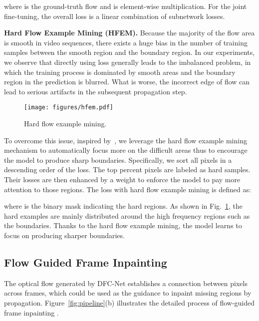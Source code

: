 \documentclass[10pt,twocolumn,letterpaper]{article}
\begin{document}
where  is the ground-truth flow and  is element-wise multiplication. For the joint fine-tuning, the overall loss is a linear combination of subnetwork losses.


\noindent\textbf{Hard Flow Example Mining (HFEM).}
Because the majority of the flow area is smooth in video sequences, there exists a huge bias in the number of training samples between the smooth region and the boundary region. In our experiments, we observe that directly using  loss generally leads to the imbalanced problem, in which the training process is dominated by smooth areas and the boundary region in the prediction is blurred.
What is worse, the incorrect edge of flow can lead to serious artifacts in the subsequent propagation step.
\begin{figure}
	\centering
	\texttt{[image: figures/hfem.pdf]}
	\vspace{-20pt}
	\caption{\small{Hard flow example mining.}}
	\label{fig:hfem}
	\vspace{-15pt}
\end{figure}

To overcome this issue, inspired by~\cite{shrivastava2016training},  we leverage the hard flow example mining mechanism to automatically focus more on the difficult areas thus to encourage the model to produce sharp boundaries.
Specifically, we sort all pixels in a descending order of the loss. The top  percent pixels are labeled as hard samples.
Their losses are then enhanced by a weight  to enforce the model to pay more attention to those regions.
The  loss with hard flow example mining is defined as:
\vspace{-5pt}

where  is the binary mask indicating the hard regions. 
As shown in Fig.~\ref{fig:hfem}, the hard examples are mainly distributed around the high frequency regions such as the boundaries.
Thanks to the hard flow example mining, the model learns to focus on producing sharper boundaries.


\subsection{Flow Guided Frame Inpainting}
\label{sec:propagation}

The optical flow generated by DFC-Net establishes a connection between pixels across frames, which could be used as the guidance to inpaint missing regions by propagation.
Figure~\ref{fig:pipeline}(b) illustrates the detailed process of flow-guided frame inpainting .
\end{document}
